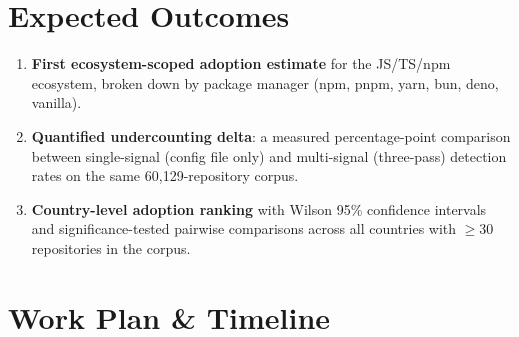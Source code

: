 \documentclass[11pt,a4paper]{article}
\begin{document}
\section{Expected Outcomes}

\begin{enumerate}[leftmargin=1.5em, itemsep=4pt]
    \item \textbf{First ecosystem-scoped adoption estimate} for the JS/TS/npm ecosystem,
          broken down by package manager (npm, pnpm, yarn, bun, deno, vanilla).
    \item \textbf{Quantified undercounting delta}: a measured percentage-point comparison
          between single-signal (config file only) and multi-signal (three-pass) detection
          rates on the same 60,129-repository corpus.
    \item \textbf{Country-level adoption ranking} with Wilson 95\% confidence intervals and
          significance-tested pairwise comparisons across all countries with $\geq$30
          repositories in the corpus.
\end{enumerate}

\section{Work Plan \& Timeline}
\end{document}
